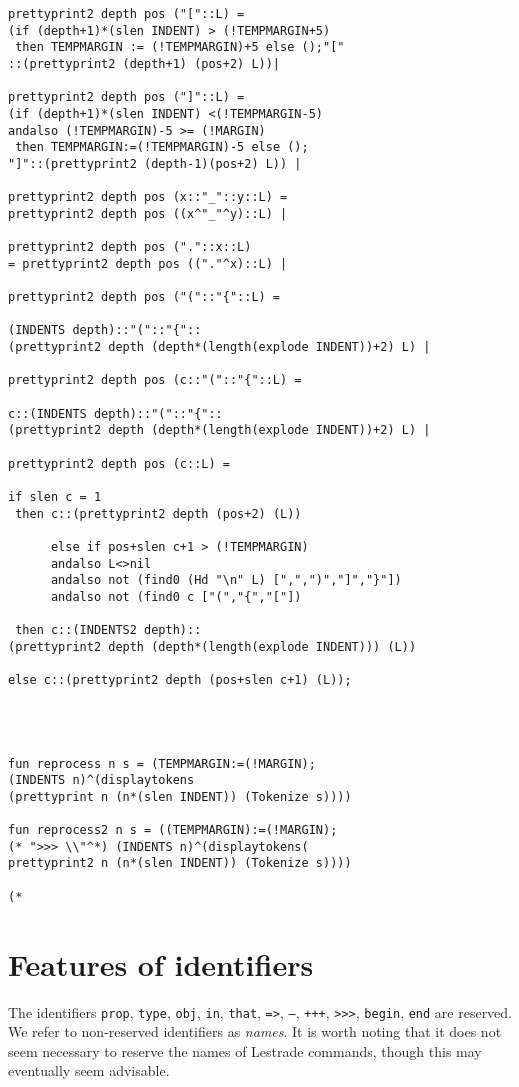 \documentclass[12pt]{article}
\begin{document}
\begin{verbatim}
prettyprint2 depth pos ("["::L) = 
(if (depth+1)*(slen INDENT) > (!TEMPMARGIN+5)
 then TEMPMARGIN := (!TEMPMARGIN)+5 else ();"[" 
::(prettyprint2 (depth+1) (pos+2) L))|

prettyprint2 depth pos ("]"::L) =
(if (depth+1)*(slen INDENT) <(!TEMPMARGIN-5)
andalso (!TEMPMARGIN)-5 >= (!MARGIN)
 then TEMPMARGIN:=(!TEMPMARGIN)-5 else (); 
"]"::(prettyprint2 (depth-1)(pos+2) L)) |

prettyprint2 depth pos (x::"_"::y::L) =
prettyprint2 depth pos ((x^"_"^y)::L) |

prettyprint2 depth pos ("."::x::L)
= prettyprint2 depth pos (("."^x)::L) |

prettyprint2 depth pos ("("::"{"::L) =

(INDENTS depth)::"("::"{"::
(prettyprint2 depth (depth*(length(explode INDENT))+2) L) |

prettyprint2 depth pos (c::"("::"{"::L) =

c::(INDENTS depth)::"("::"{"::
(prettyprint2 depth (depth*(length(explode INDENT))+2) L) |

prettyprint2 depth pos (c::L) = 

if slen c = 1
 then c::(prettyprint2 depth (pos+2) (L))

      else if pos+slen c+1 > (!TEMPMARGIN)
	  andalso L<>nil
	  andalso not (find0 (Hd "\n" L) [",",")","]","}"])
	  andalso not (find0 c ["(","{","["])
	  
 then c::(INDENTS2 depth)::
(prettyprint2 depth (depth*(length(explode INDENT))) (L))

else c::(prettyprint2 depth (pos+slen c+1) (L));




fun reprocess n s = (TEMPMARGIN:=(!MARGIN);
(INDENTS n)^(displaytokens
(prettyprint n (n*(slen INDENT)) (Tokenize s))))

fun reprocess2 n s = ((TEMPMARGIN):=(!MARGIN);
(* ">>> \\"^*) (INDENTS n)^(displaytokens(
prettyprint2 n (n*(slen INDENT)) (Tokenize s))))

(*

\end{verbatim}

\newpage

\section{Features of identifiers}

The identifiers {\tt prop}, {\tt type}, {\tt obj}, {\tt in}, {\tt that}, {\tt =>}, {\tt ---}, {\tt +++}, {\tt >>>}, {\tt begin}, {\tt end} are reserved.  We refer to non-reserved identifiers as {\em names}.  It is worth noting that it does not seem necessary to reserve the names of Lestrade commands, though this may eventually seem advisable.
\end{document}
